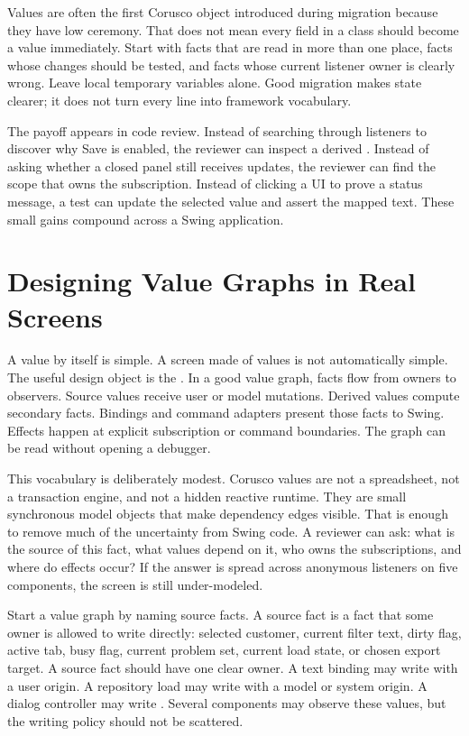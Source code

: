 Values are often the first Corusco object introduced during migration because
they have low ceremony. That does not mean every field in a class should become
a value immediately. Start with facts that are read in more than one place,
facts whose changes should be tested, and facts whose current listener owner is
clearly wrong. Leave local temporary variables alone. Good migration makes
state clearer; it does not turn every line into framework vocabulary.

The payoff appears in code review. Instead of searching through listeners to
discover why Save is enabled, the reviewer can inspect a derived
. Instead of asking whether a closed panel still receives updates,
the reviewer can find the scope that owns the subscription. Instead of clicking
a UI to prove a status message, a test can update the selected value and assert
the mapped text. These small gains compound across a Swing application.

\section{Designing Value Graphs in Real Screens}

A value by itself is simple. A screen made of values is not automatically simple.
The useful design object is the . In a good value graph, facts flow from owners to
observers. Source values receive user or model mutations. Derived values compute
secondary facts. Bindings and command adapters present those facts to Swing.
Effects happen at explicit subscription or command boundaries. The graph can be
read without opening a debugger.

This vocabulary is deliberately modest. Corusco values are not a spreadsheet, not
a transaction engine, and not a hidden reactive runtime. They are small
synchronous model objects that make dependency edges visible. That is enough to
remove much of the uncertainty from Swing code. A reviewer can ask: what is the
source of this fact, what values depend on it, who owns the subscriptions, and
where do effects occur? If the answer is spread across anonymous listeners on
five components, the screen is still under-modeled.

Start a value graph by naming source facts. A source fact is a fact that some
owner is allowed to write directly: selected customer, current filter text,
dirty flag, active tab, busy flag, current problem set, current load state, or
chosen export target. A source fact should have one clear owner. A text binding
may write  with a user origin. A repository load may write
 with a model or system origin. A dialog controller may write
. Several components may observe these values, but the writing policy
should not be scattered.

